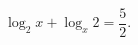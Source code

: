 \begin{ex}[type=equation]
	\begin{condition}
		 $\log_2 x +\log_x 2 = \dfrac{5}{2}.$
	\end{condition}
\end{ex}